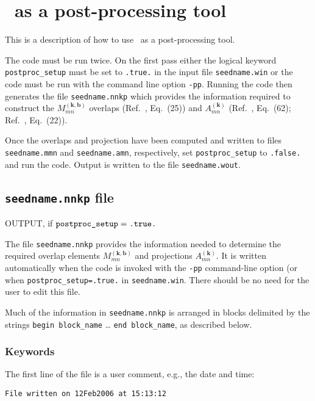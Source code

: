 \chapter{\wannier\ as a post-processing tool} \label{ch:wann-pp}

This is a description of how to use \wannier\ as a
post-processing tool. 

The code must be run twice. On the first pass either the logical
keyword \verb#postproc_setup# must be set to \verb#.true.# in the
input file \verb#seedname.win# or the code must be run with the
command line option \verb#-pp#.  Running the code then generates the
file \verb#seedname.nnkp# which provides the information required to
construct the $M_{mn}^{(\mathbf{k,b})}$ overlaps
(Ref.~\cite{marzari-prb97}, Eq.~(25)) and $A_{mn}^{(\mathbf{k})}$
(Ref.~\cite{marzari-prb97}, Eq.~(62); Ref.~\cite{souza-prb01},
Eq.~(22)).

Once the overlaps and projection have been computed and written to
files \verb#seedname.mmn# and \verb#seedname.amn#, respectively,
set \verb#postproc_setup# to \verb#.false.# and run the code. Output is
written to the file \verb#seedname.wout#.


\section{{\tt seedname.nnkp} file}

OUTPUT, if $\verb#postproc_setup#=\verb#.true.#$

The file \verb#seedname.nnkp# provides the information needed to
determine the required overlap elements $M_{mn}^{(\mathbf{k,b})}$ and
projections $A_{mn}^{(\mathbf{k})}$. It is written automatically when
the code is invoked with the \verb#-pp# command-line option (or when
\verb#postproc_setup=.true.# in \verb#seedname.win#. There should be
no need for the user to edit this file.

Much of the information in \verb#seedname.nnkp# is arranged in blocks
delimited by the strings \verb#begin block_name# \ldots
\verb#end block_name#, as described below. 


\subsection{Keywords}
The first line of the file is a user comment, e.g., the date and time:

\verb#File written on 12Feb2006 at 15:13:12#


